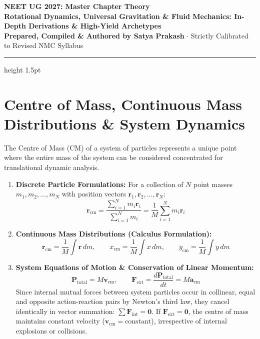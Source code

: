 \documentclass[10pt,a4paper]{article}
\begin{document}
\begin{center}
  {\Huge \textbf{NEET UG 2027: Master Chapter Theory}}\\[6pt]
  {\Large \textbf{Rotational Dynamics, Universal Gravitation \& Fluid Mechanics: In-Depth Derivations \& High-Yield Archetypes}}\\[4pt]
  {\small \textbf{Prepared, Compiled \& Authored by Satya Prakash} $\cdot$ Strictly Calibrated to Revised NMC Syllabus}
  \vspace{4pt}
  \hrule height 1.5pt
\end{center}

\section{Centre of Mass, Continuous Mass Distributions \& System Dynamics}

\begin{conceptbox}
The Centre of Mass ($\mathrm{CM}$) of a system of particles represents a unique point where the entire mass of the system can be considered concentrated for translational dynamic analysis.
\begin{enumerate}[leftmargin=*]
  \item \textbf{Discrete Particle Formulations:} For a collection of $N$ point masses $m_1, m_2, \dots, m_N$ with position vectors $\mathbf{r}_1, \mathbf{r}_2, \dots, \mathbf{r}_N$:
  \begin{equation}
    \mathbf{r}_{\text{cm}} = \frac{\sum_{i=1}^N m_i \mathbf{r}_i}{\sum_{i=1}^N m_i} = \frac{1}{M}\sum_{i=1}^N m_i \mathbf{r}_i
  \end{equation}
  \item \textbf{Continuous Mass Distributions (Calculus Formulation):}
  \begin{equation}
    \mathbf{r}_{\text{cm}} = \frac{1}{M}\int \mathbf{r}\,dm, \qquad x_{\text{cm}} = \frac{1}{M}\int x\,dm, \qquad y_{\text{cm}} = \frac{1}{M}\int y\,dm
  \end{equation}
  \item \textbf{System Equations of Motion \& Conservation of Linear Momentum:}
  \begin{equation}
    \mathbf{P}_{\text{total}} = M\mathbf{v}_{\text{cm}}, \qquad \mathbf{F}_{\text{ext}} = \frac{d\mathbf{P}_{\text{total}}}{dt} = M\mathbf{a}_{\text{cm}}
  \end{equation}
  Since internal mutual forces between system particles occur in collinear, equal and opposite action-reaction pairs by Newton's third law, they cancel identically in vector summation: $\sum \mathbf{F}_{\text{int}} = \mathbf{0}$. If $\mathbf{F}_{\text{ext}} = \mathbf{0}$, the centre of mass maintains constant velocity ($\mathbf{v}_{\text{cm}} = \text{constant}$), irrespective of internal explosions or collisions.
\end{enumerate}
\end{conceptbox}
\end{document}
